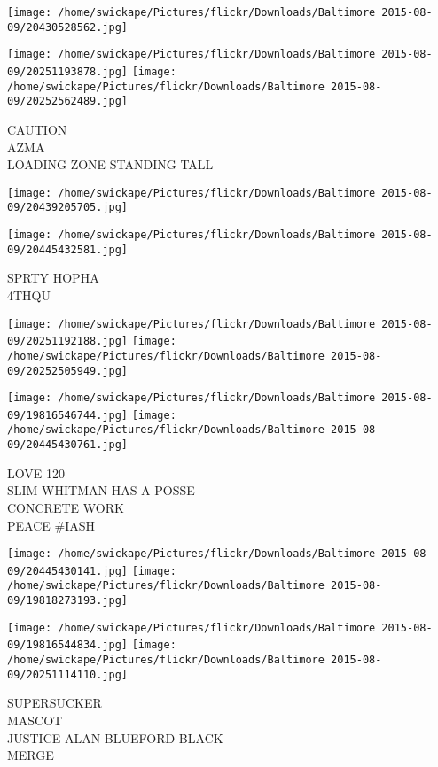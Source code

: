 \documentclass[10pt,letterpaper]{article}
\begin{document}
\texttt{[image: /home/swickape/Pictures/flickr/Downloads/Baltimore 2015-08-09/20430528562.jpg]}

\vspace{0.25in}
\texttt{[image: /home/swickape/Pictures/flickr/Downloads/Baltimore 2015-08-09/20251193878.jpg]}
\texttt{[image: /home/swickape/Pictures/flickr/Downloads/Baltimore 2015-08-09/20252562489.jpg]}

CAUTION\\
AZMA\\
LOADING ZONE STANDING TALL\\
\pagebreak

\texttt{[image: /home/swickape/Pictures/flickr/Downloads/Baltimore 2015-08-09/20439205705.jpg]}

\vspace{0.25in}
\texttt{[image: /home/swickape/Pictures/flickr/Downloads/Baltimore 2015-08-09/20445432581.jpg]}

SPRTY HOPHA\\
4THQU\\
\pagebreak

\texttt{[image: /home/swickape/Pictures/flickr/Downloads/Baltimore 2015-08-09/20251192188.jpg]}
\texttt{[image: /home/swickape/Pictures/flickr/Downloads/Baltimore 2015-08-09/20252505949.jpg]}

\texttt{[image: /home/swickape/Pictures/flickr/Downloads/Baltimore 2015-08-09/19816546744.jpg]}
\texttt{[image: /home/swickape/Pictures/flickr/Downloads/Baltimore 2015-08-09/20445430761.jpg]}

LOVE 120\\
SLIM WHITMAN HAS A POSSE\\
CONCRETE WORK\\
PEACE \#IASH\\
\pagebreak

\texttt{[image: /home/swickape/Pictures/flickr/Downloads/Baltimore 2015-08-09/20445430141.jpg]}
\texttt{[image: /home/swickape/Pictures/flickr/Downloads/Baltimore 2015-08-09/19818273193.jpg]}

\texttt{[image: /home/swickape/Pictures/flickr/Downloads/Baltimore 2015-08-09/19816544834.jpg]}
\texttt{[image: /home/swickape/Pictures/flickr/Downloads/Baltimore 2015-08-09/20251114110.jpg]}

SUPERSUCKER\\
MASCOT\\
JUSTICE ALAN BLUEFORD BLACK\\
MERGE\\
\pagebreak
\end{document}
